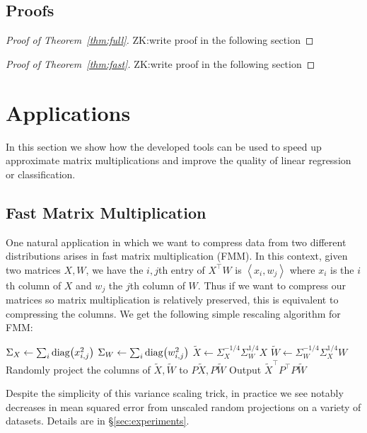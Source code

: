 \documentclass{article}
\theoremstyle{definition}
\theoremstyle{plain}
\DeclarePairedDelimiter\parentheses{\lparen}{\rparen}
\newcommand{\diag}[1]{\operatorname{diag} \parentheses*{#1}}
\newcommand{\ip}[1]{\left \langle #1 \right \rangle}
\newcommand{\zk}[1]{{\color{blue}ZK:#1}}
\begin{document}
\subsection{Proofs}

\begin{proof} [Proof of Theorem~\ref{thm:full}]
\zk{write proof in the following section}
\end{proof}

\begin{proof} [Proof of Theorem~\ref{thm:fast}]
\zk{write proof in the following section}
\end{proof}

%
%
%
%
%
%
%
%
%
%
%
%
%
%
%
%
%

\section{Applications}

In this section we show how the developed tools can be used to speed up approximate matrix multiplications and improve the quality of linear regression or classification.

\subsection{Fast Matrix Multiplication} \label{sec:FMM}
One natural application in which we want to compress data from two different distributions arises in fast matrix multiplication (FMM). In this context, given two matrices $X, W$, we have the $i,j$th entry of $X^\top W$ is $\ip{x_i, w_j}$ where $x_i$ is the $i$th column of $X$ and $w_j$ the $j$th column of $W$. Thus if we want to compress our matrices so matrix multiplication is relatively preserved, this is equivalent to compressing the columns. We get the following simple rescaling algorithm for FMM: \\

\begin{algorithm}[H]
 $\Sigma_X \gets \sum_i \diag{ x_{i,j}^2 }$\;
 $\Sigma_W \gets \sum_i \diag{ w_{i,j}^2 }$\;
 $\tilde{X} \gets \Sigma_X^{-1/4}\Sigma_W^{1/4}X$\;
 $\tilde{W} \gets \Sigma_W^{-1/4}\Sigma_X^{1/4}W$\;
 Randomly project the columns of $\tilde{X}, \tilde{W}$ to $P \tilde{X}, P \tilde{W}$\;
 Output $\tilde{X}^\top P^\top P \tilde{W}$\;
 \caption{Fast Variance Scaling FMM}
 \end{algorithm}
Despite the simplicity of this variance scaling trick, in practice we see notably decreases in mean squared error from unscaled random projections on a variety of datasets. Details are in \S\ref{sec:experiments}.
\end{document}
